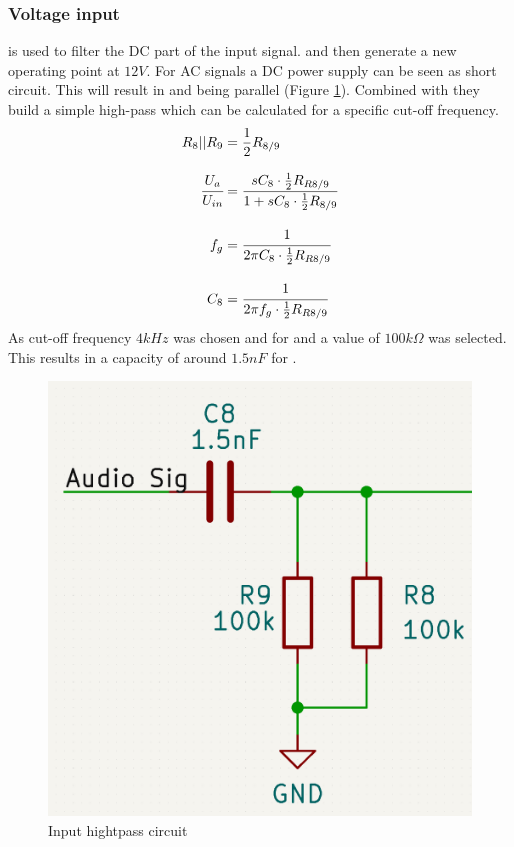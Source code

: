 \subsubsection*{Voltage input}
%
 is used to filter the DC part of the input signal.  and  then generate a new operating point at $12V$. For AC signals a DC power supply can be seen as short circuit. This will result in  and  being parallel (Figure \ref{fig:pcb:amp_hp}). Combined with  they build a simple high-pass which can be calculated for a specific cut-off frequency.
%
\begin{align}
  R_8 || R_9 &= \frac{1}{2} R_{8/9} \pmath
  \cfrac{U_a}{U_{in}} &= \cfrac{sC_8\cdot \frac{1}{2}R_{R8/9}}{1 + sC_8\cdot \frac{1}{2}R_{8/9}} \pmath
  f_g &= \cfrac{1}{2 \pi C_8 \cdot \frac{1}{2}R_{R8/9}} \pmath
  C_8 &= \cfrac{1}{2 \pi f_g \cdot \frac{1}{2}R_{R8/9}}
\end{align}
%
As cut-off frequency $4kHz$ was chosen and for  and  a value of $100k\Omega$ was selected. This results in a capacity of around $1.5nF$ for .
%
\begin{figure}
  \centering
  \includegraphics[height=\smallheight]{src/assets/pictures/circuit/amp_hp_circuit.png}
  \caption{Input hightpass circuit}\label{fig:pcb:amp_hp}
\end{figure}
%
